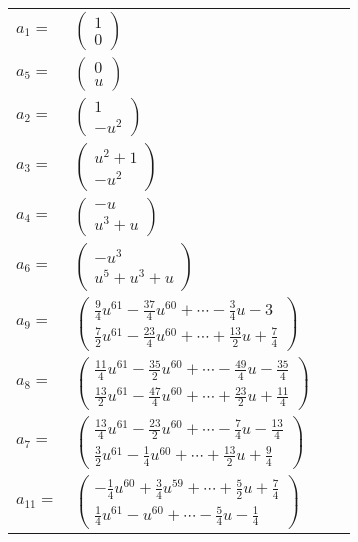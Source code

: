 \documentclass[1p]{elsarticle_modified}
\theoremstyle{definition}
\begin{document}
\begin{tabular}{m{7pt} m{180pt} m{7pt} m{180pt} }
\flushright $a_{1}=$&$\begin{pmatrix}1\\0\end{pmatrix}$ \\
\flushright $a_{5}=$&$\begin{pmatrix}0\\u\end{pmatrix}$ \\
\flushright $a_{2}=$&$\begin{pmatrix}1\\- u^2\end{pmatrix}$ \\
\flushright $a_{3}=$&$\begin{pmatrix}u^2+1\\- u^2\end{pmatrix}$ \\
\flushright $a_{4}=$&$\begin{pmatrix}- u\\u^3+u\end{pmatrix}$ \\
\flushright $a_{6}=$&$\begin{pmatrix}- u^3\\u^5+u^3+u\end{pmatrix}$ \\
\flushright $a_{9}=$&$\begin{pmatrix}\frac{9}{4} u^{61}-\frac{37}{4} u^{60}+\cdots-\frac{3}{4} u-3\\\frac{7}{2} u^{61}-\frac{23}{4} u^{60}+\cdots+\frac{13}{2} u+\frac{7}{4}\end{pmatrix}$ \\
\flushright $a_{8}=$&$\begin{pmatrix}\frac{11}{4} u^{61}-\frac{35}{2} u^{60}+\cdots-\frac{49}{4} u-\frac{35}{4}\\\frac{13}{2} u^{61}-\frac{47}{4} u^{60}+\cdots+\frac{23}{2} u+\frac{11}{4}\end{pmatrix}$ \\
\flushright $a_{7}=$&$\begin{pmatrix}\frac{13}{4} u^{61}-\frac{23}{2} u^{60}+\cdots-\frac{7}{4} u-\frac{13}{4}\\\frac{3}{2} u^{61}-\frac{1}{4} u^{60}+\cdots+\frac{13}{2} u+\frac{9}{4}\end{pmatrix}$ \\
\flushright $a_{11}=$&$\begin{pmatrix}-\frac{1}{4} u^{60}+\frac{3}{4} u^{59}+\cdots+\frac{5}{2} u+\frac{7}{4}\\\frac{1}{4} u^{61}- u^{60}+\cdots-\frac{5}{4} u-\frac{1}{4}\end{pmatrix}$ \\

\end{tabular}
\end{document}
